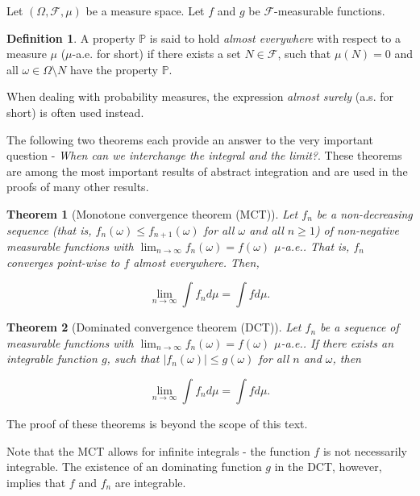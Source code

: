 \documentclass{book}
\theoremstyle{plain}%
\newtheorem{theorem}{Theorem}[section]
\theoremstyle{definition}
\newtheorem{definition}{Definition}[section]
\newlength{\arrow}
\begin{document}
Let $(\Omega, \mathcal{F}, \mu)$ be a measure space. Let $f$ and $g$ be $\mathcal{F}$-measurable functions.

\begin{definition}
A property $\mathbb{P}$ is said to hold \emph{almost everywhere} with respect to a measure $\mu$ ($\mu$-a.e. for short) if there exists a set $N \in \mathcal{F}$, such that $\mu(N) = 0$ and all $\omega \in \Omega \setminus N$ have the property $\mathbb{P}$.
\end{definition}

When dealing with probability measures, the expression \emph{almost surely} (a.s. for short) is often used instead.

The following two theorems each provide an answer to the very important question - \emph{When can we interchange the integral and the limit?}. These theorems are among the most important results of abstract integration and are used in the proofs of many other results.

\begin{theorem}[Monotone convergence theorem (MCT)]
Let $f_n$ be a non-decreasing sequence (that is, $f_n(\omega) \leq f_{n+1}(\omega)$ for all $\omega$ and all $n \geq 1$) of non-negative measurable functions with $\lim_{n \rightarrow \infty} f_n(\omega)  = f(\omega)$ $\mu$-a.e.. That is, $f_n$ converges point-wise to $f$ almost everywhere. Then,

$$\lim_{n \rightarrow \infty}  \int f_n d\mu = \int f d\mu.$$
\label{thm:mct}
\end{theorem}

\begin{theorem}[Dominated convergence theorem (DCT)]
Let $f_n$ be a sequence of measurable functions with $\lim_{n \rightarrow \infty} f_n(\omega)  = f(\omega)$ $\mu$-a.e.. If there exists an integrable function $g$, such that $|f_n(\omega) | \leq g(\omega)$ for all $n$ and $\omega$, then

$$\lim_{n \rightarrow \infty}  \int f_n d\mu = \int f d\mu.$$
\label{thm:mct}
\end{theorem}

The proof of these theorems is beyond the scope of this text. 

Note that the MCT allows for infinite integrals - the function $f$ is not necessarily integrable. The existence of an dominating function $g$ in the DCT, however, implies that $f$ and $f_n$ are integrable.
\end{document}
